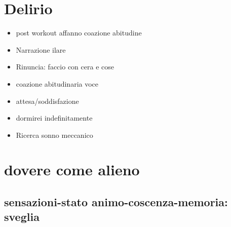 \section{Delirio}

\begin{itemize}
\item post workout affanno coazione abitudine
\item Narrazione ilare
\item Rinuncia: faccio con cera e cose
\item coazione abitudinaria voce
\item attesa/soddisfazione
\item dormirei indefinitamente
\item Ricerca sonno meccanico
\end{itemize}

\section{dovere come alieno}

\subsection{sensazioni-stato animo-coscenza-memoria: sveglia}

